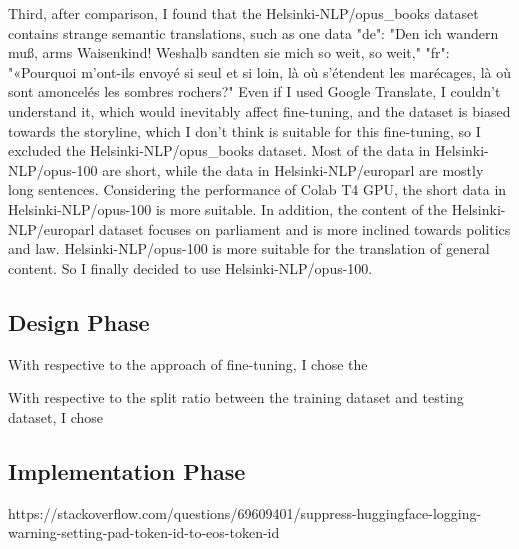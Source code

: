 Third, after comparison,
I found that the Helsinki-NLP/opus\_books dataset contains strange semantic translations, 
such as one data "de": "Den ich wandern muß, arms Waisenkind! Weshalb sandten sie mich so weit, so weit," 
"fr": "«Pourquoi m'ont-ils envoyé si seul et si loin, là où s'étendent les marécages, 
là où sont amoncelés les sombres rochers?" 
Even if I used Google Translate, I couldn't understand it, 
which would inevitably affect fine-tuning, 
and the dataset is biased towards the storyline, 
which I don't think is suitable for this fine-tuning, 
so I excluded the Helsinki-NLP/opus\_books dataset.
Most of the data in Helsinki-NLP/opus-100 are short,
while the data in Helsinki-NLP/europarl are mostly long sentences. 
Considering the performance of Colab T4 GPU, the short data in Helsinki-NLP/opus-100 is more suitable. 
In addition, the content of the Helsinki-NLP/europarl dataset focuses on parliament 
and is more inclined towards politics and law. 
Helsinki-NLP/opus-100 is more suitable for the translation of general content. 
So I finally decided to use Helsinki-NLP/opus-100.

\subsection{Design Phase}
\label{subsec:design}
With respective to the approach of fine-tuning, I chose the 

With respective to the split ratio between the training dataset and testing dataset, I chose 

\subsection{Implementation Phase}
\label{subsec:implementation}

https://stackoverflow.com/questions/69609401/suppress-huggingface-logging-warning-setting-pad-token-id-to-eos-token-id